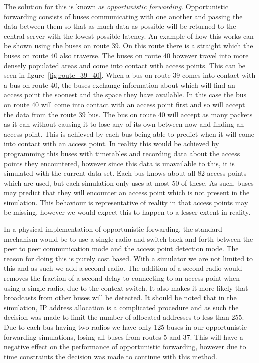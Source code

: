         The solution for this is known as \emph{opportunistic forwarding}. Opportunistic forwarding consists of buses communicating with one another and passing the data between them so that as much data as possible will be returned to the central server with the lowest possible latency. An example of how this works can be shown using the buses on route 39. On this route there is a straight which the buses on route 40 also traverse. The buses on route 40 however travel into more densely populated areas and come into contact with access points. This can be seen in figure~\ref{fig:route_39_40}. When a bus on route 39 comes into contact with a bus on route 40, the buses exchange information about which will find an access point the soonest and the space they have available. In this case the bus on route 40 will come into contact with an access point first and so will accept the data from the route 39 bus. The bus on route 40 will accept as many packets as it can without causing it to lose any of its own between now and finding an access point. This is achieved by each bus being able to predict when it will come into contact with an access point. In reality this would be achieved by programming this buses with timetables and recording data about the access points they encountered, however since this data is unavailable to this, it is simulated with the current data set. Each bus knows about all 82 access points which are used, but each simulation only uses at most 50 of these. As such, buses may predict that they will encounter an access point which is not present in the simulation. This behaviour is representative of reality in that access points may be missing, however we would expect this to happen to a lesser extent in reality.   


        In a physical implementation of opportunistic forwarding, the standard mechanism would be to use a single radio and switch back and forth between the peer to peer communication mode and the access point detection mode. The reason for doing this is purely cost based. With a simulator we are not limited to this and as such we add a second radio. The addition of a second radio would removes the fraction of a second delay to connecting to an access point when using a single radio, due to the context switch. It also makes it more likely that broadcasts from other buses will be detected. It should be noted that in the simulation, IP address allocation is a complicated procedure and as such the decision was made to limit the number of allocated addresses to less than 255. Due to each bus having two radios we have only 125 buses in our opportunistic forwarding simulations, losing all buses from routes 5 and 37. This will have a negative effect on the performance of opportunistic forwarding, however due to time constraints the decision was made to continue with this method.

